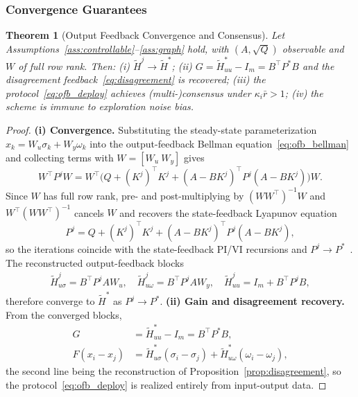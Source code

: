 \documentclass[12pt]{elsarticle}
\newtheorem{theorem}{Theorem}
\theoremstyle{remark}
\begin{document}
\subsubsection{Convergence Guarantees}
\label{subsec:ofb_convergence}
\begin{theorem}[Output Feedback Convergence and Consensus]
\label{thm:ofb_convergence}
Let Assumptions~\ref{ass:controllable}--\ref{ass:graph} hold, with $(A, \sqrt{Q})$ observable and $W$ of full row rank. Then:
(i) $\tilde{H}^j \to \tilde{H}^*$;
(ii) $G = \tilde{H}_{uu}^* - I_m = B^\top P^*B$ and the disagreement feedback~\eqref{eq:disagreement} is recovered;
(iii) the protocol~\eqref{eq:ofb_deploy} achieves (multi-)consensus under $\kappa_i \bar{r} > 1$;
(iv) the scheme is immune to exploration noise bias.
\end{theorem}
\begin{proof}
\textbf{(i) Convergence.} Substituting the steady-state parameterization $x_k = W_u\sigma_k + W_y\omega_k$ into the output-feedback Bellman equation~\eqref{eq:ofb_bellman} and collecting terms with $W=[W_u\ W_y]$ gives
\begin{equation*}
W^\top P^j W = W^\top\!\big(Q + (K^j)^\top K^j + (A - BK^j)^\top P^j (A - BK^j)\big) W.
\end{equation*}
Since $W$ has full row rank, pre- and post-multiplying by $(WW^\top)^{-1}W$ and $W^\top(WW^\top)^{-1}$ cancels $W$ and recovers the state-feedback Lyapunov equation
\begin{equation*}
P^j = Q + (K^j)^\top K^j + (A - BK^j)^\top P^j (A - BK^j),
\end{equation*}
so the iterations coincide with the state-feedback PI/VI recursions and $P^j \to P^*$~\cite[Thms.~2.6, 2.7]{rizvi2022}. The reconstructed output-feedback blocks
\begin{align*}
\tilde{H}_{u\sigma}^j = B^\top P^j A W_u, \quad
\tilde{H}_{u\omega}^j = B^\top P^j A W_y, \quad
\tilde{H}_{uu}^j = I_m + B^\top P^j B,
\end{align*}
therefore converge to $\tilde{H}^*$ as $P^j \to P^*$.
\textbf{(ii) Gain and disagreement recovery.} From the converged blocks,
\begin{align*}
G &= \tilde{H}_{uu}^* - I_m = B^\top P^* B,\\
F(x_i - x_j) &= \tilde{H}_{u\sigma}^*(\sigma_i - \sigma_j) + \tilde{H}_{u\omega}^*(\omega_i - \omega_j),
\end{align*}
the second line being the reconstruction of Proposition~\ref{prop:disagreement}, so the protocol~\eqref{eq:ofb_deploy} is realized entirely from input-output data.

\end{proof}
\end{document}
